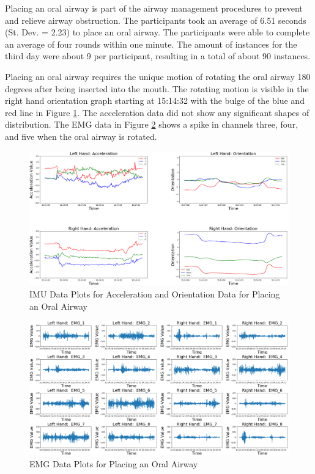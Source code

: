 Placing an oral airway is part of the airway management procedures to prevent and relieve airway obstruction. The participants took an average of 6.51 seconds (St. Dev. = 2.23) to place an oral airway. The participants were able to complete an average of four rounds within one minute. The amount of instances for the third day were about 9 per participant, resulting in a total of about 90 instances.
\par Placing an oral airway requires the unique motion of rotating the oral airway 180 degrees after being inserted into the mouth. The rotating motion is visible in the right hand orientation graph starting at 15:14:32 with the bulge of the blue and red line in Figure \ref{fig:2334imuday3o22}. The acceleration data did not show any significant shapes of distribution. The EMG data in Figure \ref{fig:2334emgday3o22} shows a spike in channels three, four, and five when the oral airway is rotated.
\begin{figure}[!h]
	\centering
	\includegraphics[width=0.8\linewidth]{pictures/2334_IMU_Day3_o_22}
	\caption{IMU Data Plots for Acceleration and Orientation Data for Placing an Oral Airway}
	\label{fig:2334imuday3o22}
\end{figure}
\begin{figure}[!h]
	\centering
	\includegraphics[width=0.8\linewidth]{pictures/2334_EMG_Day3_o_22}
	\caption{EMG Data Plots for Placing an Oral Airway}
	\label{fig:2334emgday3o22}
\end{figure}

